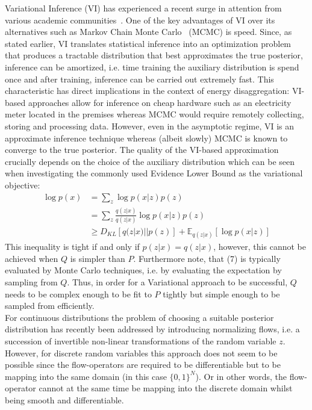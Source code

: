 Variational Inference (VI) has experienced a recent surge in attention from various academic communities~\cite{hoffman2013stochastic,kingma2013auto}. One of the key advantages of VI over its alternatives such as Markov Chain Monte Carlo~\cite{geman1984stochastic} (MCMC) is speed. Since, as stated earlier, VI translates statistical inference into an optimization problem that produces a tractable distribution that best approximates the true posterior, inference can be amortized, i.e. time training the auxiliary distribution is spend once and after training, inference can be carried out extremely fast. This characteristic has direct implications in the context of energy disaggregation: VI-based approaches allow for inference on cheap hardware such as an electricity meter located in the premises whereas MCMC would require remotely collecting, storing and processing data. However, even in the asymptotic regime, VI is an approximate inference technique whereas (albeit slowly) MCMC is known to converge to the true posterior. The quality of the VI-based approximation crucially depends on the choice of the auxiliary distribution which can be seen when investigating the commonly used Evidence Lower Bound as the variational objective:
\begin{align}
\log p(x) &= \sum_z \log p(x|z) p(z)\\
              &= \sum_z \frac{q(z|x)}{q(z|x)} \log p(x|z) p(z)\\
              &\geq D_{KL} [q(z|x) || p(z)] + \mathbb{E}_{q(z|x)} [\log p(x|z)]
\end{align}
This inequality is tight if and only if $p(z|x) = q(z|x)$, however, this cannot be achieved when $Q$ is simpler than $P$. Furthermore note, that (7) is typically evaluated by Monte Carlo techniques, i.e. by evaluating the expectation by sampling from $Q$. Thus, in order for a Variational approach to be successful, $Q$ needs to be complex enough to be fit to $P$ tightly but simple enough to be sampled from efficiently.\\
For continuous distributions the problem of choosing a suitable posterior distribution has recently been addressed by introducing normalizing flows\cite{rezende2015variational}, i.e. a succession of invertible non-linear transformations of the random variable $z$. However, for discrete random variables this approach does not seem to be possible since the flow-operators are required to be differentiable but to be mapping into the same domain (in this case $\{0,1\}^N$). Or in other words, the flow-operator cannot at the same time be mapping into the discrete domain whilst being smooth and differentiable.\\
